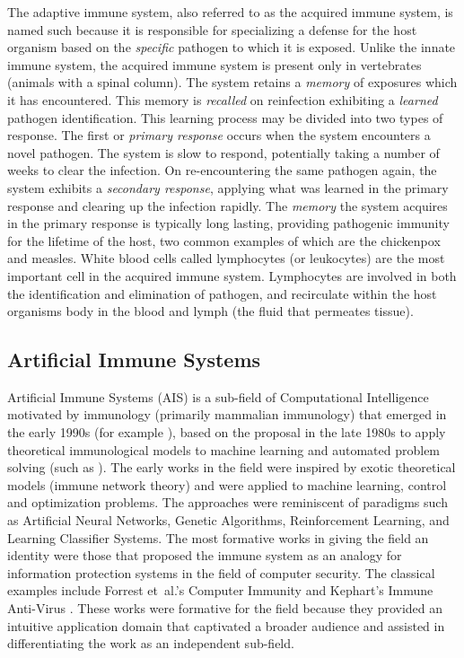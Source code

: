\begin{bibunit}
The adaptive immune system, also referred to as the acquired immune system, is named such because it is responsible for specializing a defense for the host organism based on the \emph{specific} pathogen to which it is exposed. Unlike the innate immune system, the acquired immune system is present only in vertebrates (animals with a spinal column). The system retains a \emph{memory} of exposures which it has encountered. This memory is \emph{recalled} on reinfection exhibiting a \emph{learned} pathogen identification. This learning process may be divided into two types of response. The first or \emph{primary response} occurs when the system encounters a novel pathogen. The system is slow to respond, potentially taking a number of weeks to clear the infection. On re-encountering the same pathogen again, the system exhibits a \emph{secondary response}, applying what was learned in the primary response and clearing up the infection rapidly. The \emph{memory} the system acquires in the primary response is typically long lasting, providing pathogenic immunity for the lifetime of the host, two common examples of which are the chickenpox and measles. White blood cells called lymphocytes (or leukocytes) are the most important cell in the acquired immune system. Lymphocytes are involved in both the identification and elimination of pathogen, and recirculate within the host organisms body in the blood and lymph (the fluid that permeates tissue). 

\subsection{Artificial Immune Systems}
Artificial Immune Systems (AIS) is a sub-field of Computational Intelligence motivated by immunology (primarily mammalian immunology) that emerged in the early 1990s (for example \cite{Bersini1990, Ishida1990}), based on the proposal in the late 1980s to apply theoretical immunological models to machine learning and automated problem solving (such as \cite{Hoffmann1986, Farmer1986}). The early works in the field were inspired by exotic theoretical models (immune network theory) and were applied to machine learning, control and optimization problems. The approaches were reminiscent of paradigms such as Artificial Neural Networks, Genetic Algorithms, Reinforcement Learning, and Learning Classifier Systems. The most formative works in giving the field an identity were those that proposed the immune system as an analogy for information protection systems in the field of computer security. The classical examples include Forrest et~al.'s Computer Immunity \cite{Forrest1994, Forrest1997a} and Kephart's Immune Anti-Virus \cite{Kephart1994, Kephart1995}. These works were formative for the field because they provided an intuitive application domain that captivated a broader audience and assisted in differentiating the work as an independent sub-field.


\end{bibunit}
